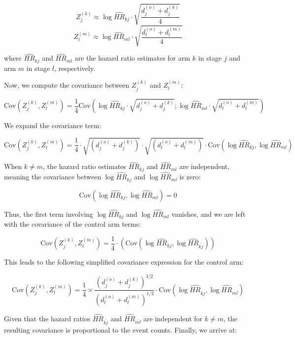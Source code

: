 \documentclass[11pt, a4paper]{article}\usepackage[]{graphicx}\usepackage[]{xcolor}
\begin{document}
{\[
Z_j^{(k)} \approx \log \widehat{HR}_{kj} \cdot \sqrt{\frac{d_j^{(o)} + d_j^{(k)}}{4}}
\]
\[
Z_l^{(m)} \approx \log \widehat{HR}_{ml} \cdot \sqrt{\frac{d_l^{(o)} + d_l^{(m)}}{4}}
\]

where \( \widehat{HR}_{kj} \) and \( \widehat{HR}_{ml} \) are the hazard ratio estimates for arm \( k \) in stage \( j \) and arm \( m \) in stage \( l \), respectively.


Now, we compute the covariance between \( Z_j^{(k)} \) and \( Z_l^{(m)} \):

\[
\text{Cov} \left( Z_j^{(k)} , Z_l^{(m)} \right) = \frac{1}{4} \text{Cov}\left( \log \widehat{HR}_{kj} \cdot \sqrt{d_j^{(o)} + d_j^{(k)}} ; \log \widehat{HR}_{ml} \cdot \sqrt{d_l^{(o)} + d_l^{(m)}} \right)
\]

We expand the covariance term:

\[
\text{Cov} \left( Z_j^{(k)} , Z_l^{(m)} \right) = \frac{1}{4} \cdot \sqrt{(d_j^{(o)} + d_j^{(k)})} \cdot \sqrt{(d_l^{(o)} + d_l^{(m)})} \cdot \text{Cov}\left( \log \widehat{HR}_{kj}, \log \widehat{HR}_{ml} \right)
\]

When \( k \neq m \), the hazard ratio estimates \( \widehat{HR}_{kj} \) and \( \widehat{HR}_{ml} \) are independent, meaning the covariance between \( \log \widehat{HR}_{kj} \) and \( \log \widehat{HR}_{ml} \) is zero:

\[
\text{Cov}\left( \log \widehat{HR}_{kj}, \log \widehat{HR}_{ml} \right) = 0
\]

Thus, the first term involving \( \log \widehat{HR}_{kj} \) and \( \log \widehat{HR}_{ml} \) vanishes, and we are left with the covariance of the control arm terms:

\[
\text{Cov} \left( Z_j^{(k)} , Z_l^{(m)} \right) = \frac{1}{4} \cdot \left( \text{Cov} \left( \log \widehat{HR}_{kj}, \log \widehat{HR}_{\overline{kj}} \right) \right)
\]

This leads to the following simplified covariance expression for the control arm:

\[
\text{Cov} \left( Z_j^{(k)} , Z_l^{(m)} \right) = \frac{1}{4} \times \frac{(d_j^{(o)} + d_j^{(k)})^{3/2}}{(d_l^{(o)} + d_l^{(m)})^{1/2}} \cdot \text{Cov} \left( \log \widehat{HR}_{\overline{kj}}, \log \widehat{HR}_{\overline{ml}} \right)
\]

Given that the hazard ratios \( \widehat{HR}_{\overline{kj}} \) and \( \widehat{HR}_{\overline{ml}} \) are independent for \( k \neq m \), the resulting covariance is proportional to the event counts. Finally, we arrive at:

}
\end{document}
